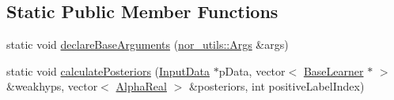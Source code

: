 \subsection*{Static Public Member Functions}
\begin{DoxyCompactItemize}
\item 
static void \hyperlink{classMultiBoost_1_1VJCascadeLearner_ad45c91f32930c935b970a92717397125}{declare\-Base\-Arguments} (\hyperlink{classnor__utils_1_1Args}{nor\-\_\-utils\-::\-Args} \&args)
\item 
static void \hyperlink{classMultiBoost_1_1VJCascadeLearner_a7fbf26261b14a838496cd9e7e072f021}{calculate\-Posteriors} (\hyperlink{classMultiBoost_1_1InputData}{Input\-Data} $\ast$p\-Data, vector$<$ \hyperlink{classMultiBoost_1_1BaseLearner}{Base\-Learner} $\ast$ $>$ \&weakhyps, vector$<$ \hyperlink{Defaults_8h_a80184c4fd10ab70a1a17c5f97dcd1563}{Alpha\-Real} $>$ \&posteriors, int positive\-Label\-Index)
\end{DoxyCompactItemize}
